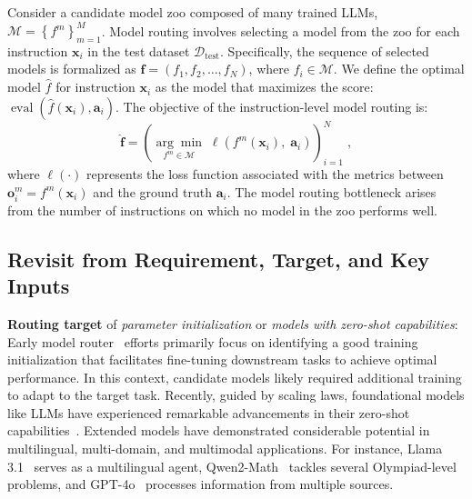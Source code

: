 Consider a candidate model zoo composed of many trained LLMs, $\mathcal{M} = \left\{f^m\right\}_{m=1}^{M}$. Model routing involves selecting a model from the zoo for each instruction $\mathbf{x}_i$ in the test dataset $\mathcal{D}_{\text{test}}$.
Specifically, the sequence of selected models is formalized as $\boldsymbol{f} = (f_1, f_2, \dots, f_N)$, where $f_i \in \mathcal{M}$.
We define the optimal model $\hat{f}$ for instruction $\mathbf{x}_i$ as the model that maximizes the score: $\operatorname{eval}\left(\hat{f}(\mathbf{x}_i), \mathbf{a}_i \right)$.
The objective of the instruction-level model routing is:
\begin{equation}
    \hat{\boldsymbol{f}} = \left( \underset{ {f}^m \in \mathcal{M} }{\arg \min } \; \ell \left({f}^m \left( \mathbf{x}_i \right),\; \mathbf{a}_i \right) \right)_{i = 1}^{N}\;,\label{eq:objective}
\end{equation}
where $\ell \left( \cdot \right)$ represents the loss function associated with the metrics between $\mathbf{o}^m_i = f^m(\mathbf{x}_i)$ and the ground truth $\mathbf{a}_i$.
The model routing bottleneck arises from the number of instructions on which no model in the zoo performs well.

\subsection{Revisit from Requirement, Target, and Key Inputs}

\textbf{Routing target} of \textit{parameter initialization} or \textit{models with zero-shot capabilities}: Early model router~\cite{tran2019transferability, nguyen2020leep,DBLP:conf/cvpr/TanLH21,DBLP:conf/eccv/DingCLCS22} efforts primarily focus on identifying a good training initialization that facilitates fine-tuning downstream tasks to achieve optimal performance. In this context, candidate models likely required additional training to adapt to the target task.
Recently, guided by scaling laws, foundational models like LLMs have experienced remarkable advancements in their zero-shot capabilities~\cite{touvron2023llama2,wei2022finetuned,team2023gemini}.
Extended models have demonstrated considerable potential in multilingual, multi-domain, and multimodal applications. For instance, Llama 3.1~\cite{dubey2024llama3herdmodels} serves as a multilingual agent, Qwen2-Math~\cite{yang2024qwen2technicalreport} tackles several Olympiad-level problems, and GPT-4o~\cite{openai2023gpt4} processes information from multiple sources.

